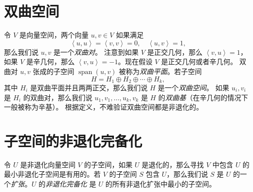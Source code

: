 \documentclass[fontset=none,zihao=-4]{Notes}
\newcommand{\inn}[1]{\left\langle#1\right\rangle}
\newcommand{\spa}[1]{\operatorname{span}\left(#1\right)}
\begin{document}
\section{双曲空间}

令 $V$ 是向量空间，两个向量 $u,v\in V$ 如果满足
\[
  \inn{u,u}=\inn{v,v}=0,\quad \inn{u,v}=1,  
\]
那么我们说 $u,v$ 是一个\emph{双曲对}。
注意到如果 $V$ 是正交几何，那么 $\inn{v,u}=1$，如果 $V$ 是辛几何，那么
$\inn{v,u}=-1$。现在假设 $V$ 是正交几何或者辛几何。
双曲对 $u,v$ 张成的子空间 $\spa{u,v}$
被称为\emph{双曲平面}。若子空间
\[
  H=H_1\oplus H_2\oplus\cdots\oplus H_k,  
\]
其中 $H_i$ 是双曲平面并且两两正交，那么我们说 $H$ 是一个\emph{双曲空间}。
如果 $u_i,v_i$ 是 $H_i$ 的双曲对，那么我们说 $u_1,v_1,\dots,u_k,v_k$
是 $H$ 的\emph{双曲基}（在辛几何的情况下一般被称为辛基）。
根据定义，不难验证双曲空间都是非退化的。

\section{子空间的非退化完备化}

令 $U$ 是非退化向量空间 $V$ 的子空间，如果 $U$ 是退化的，那么寻找
$V$ 中包含 $U$ 的最小非退化子空间是有用的。若 $V$ 的子空间 $S$
包含 $U$，那么我们说 $S$ 是 $U$ 的一个\emph{扩张}。$U$ 的\emph{非退化完备化}
是 $U$ 的所有非退化扩张中最小的子空间。
\end{document}
